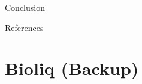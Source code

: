 \documentclass[16pt,usenames,dvipsnames, notheorems]{beamer}
\theoremstyle{definition}
\theoremstyle{example}
\theoremstyle{plain}
\begin{document}
\begin{frame}{Conclusion}
\end{frame}


\appendix
\beginbackup

\begin{frame}[allowframebreaks]{References}
\scriptsize


\end{frame}

\section{Bioliq (Backup)}
\end{document}
